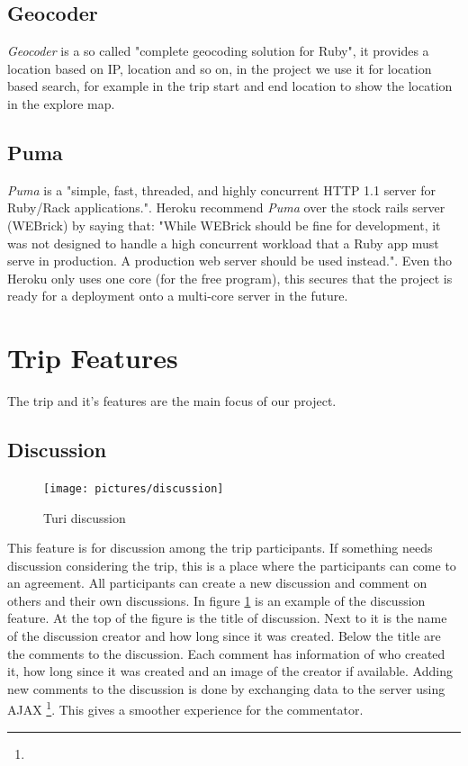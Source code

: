 \documentclass[a4paper]{article}
\begin{document}
\subsection{Geocoder}
\textit{Geocoder} is a so called "complete geocoding solution for Ruby"\cite{geocoder}, it provides a location based on IP, location and so on, in the project we use it for location based search, for example in the trip start and end location to show the location in the explore map. 

\subsection{Puma}
\textit{Puma} is a "simple, fast, threaded, and highly concurrent HTTP 1.1 server for Ruby/Rack applications."\cite{puma}. Heroku recommend \textit{Puma} over the stock rails server (WEBrick) by saying that: "While WEBrick should be fine for development, it was not designed to handle a high concurrent workload that a Ruby app must serve in production. A production web server should be used instead."\cite{heroku_webserver}. Even tho Heroku only uses one core (for the free program), this secures that the project is ready for a deployment onto a multi-core server in the future.  


\section{Trip Features}
The trip and it's features are the main focus of our project. 
\subsection{Discussion}

\begin{figure}%
  \begin{center}
    \vspace{-0pt}
    \texttt{[image: pictures/discussion]}
  \end{center}
\caption{Turi discussion}
\label{fig:discussion}
\end{figure}

This feature is for discussion among the trip participants. If something needs discussion considering the trip, this is a place where the participants can come to an agreement. All participants can create a new discussion and comment on others and their own discussions. In figure \ref{fig:discussion} is an example of the discussion feature. At the top of the figure is the title of discussion. Next to it is the name of the discussion creator and how long since it was created. Below the title are the comments to the discussion. Each comment has information of who created it, how long since it was created and an image of the creator if available. Adding new comments to the discussion is done by exchanging data to the server using AJAX \footnote{\AJAX}. This gives a smoother experience for the commentator. 
\end{document}
